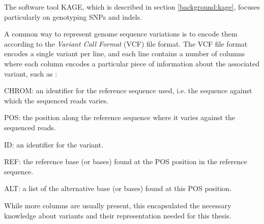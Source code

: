 The software tool KAGE, which is described in section \ref{background:kage}, focuses particularly on genotyping SNPs and indels.

A common way to represent genome sequence variations is to encode them according to the \textit{Variant Call Format} (VCF) file format.
The VCF file format encodes a single variant per line, and each line contains a number of columns where each column encodes a particular piece of information about the associated variant, such as \cite{vcf}:
\begin{compactenum}
  \item
    CHROM: an identifier for the reference sequence used, i.e. the sequence against which the sequenced reads varies.
  \item
    POS: the position along the reference sequence where it varies against the sequenced reads.
  \item
    ID: an identifier for the variant.
  \item
    REF: the reference base (or bases) found at the POS position in the reference sequence.
  \item
    ALT: a list of the alternative base (or bases) found at this POS position.
\end{compactenum}
While more columns are usually present, this encapsulated the necessary knowledge about variants and their representation needed for this thesis.


